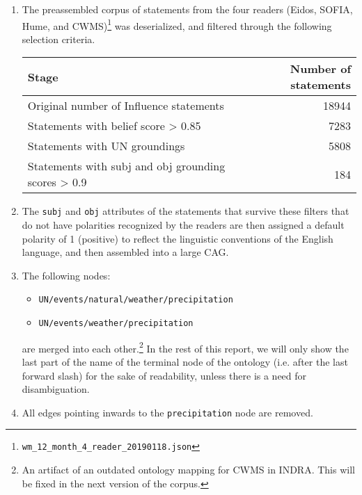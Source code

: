 \documentclass{apnotes}
\begin{document}
\begin{enumerate}

  \item The preassembled corpus of statements from the four readers (Eidos,
    SOFIA, Hume, and
    CWMS)\footnote{\texttt{wm\_12\_month\_4\_reader\_20190118.json}} was
    deserialized, and filtered through the following selection criteria.

\begin{center}
  \begin{tabular}{lr}
      \toprule
      Stage                                               & Number of statements\\
      \midrule
      Original number of Influence statements             & 18944\\
      Statements with belief score > 0.85                 & 7283\\
      Statements with UN groundings                       & 5808\\
      Statements with subj and obj grounding scores > 0.9 & 184\\
      \bottomrule
  \end{tabular}
\end{center}

\item The \texttt{subj} and \texttt{obj} attributes of the statements that
  survive these filters that do not have polarities recognized by the readers
  are then assigned a default polarity of 1 (positive) to reflect the linguistic
  conventions of the English language, and then assembled into a large CAG.

\item The following nodes:
  \begin{itemize}
    \item \texttt{UN/events/natural/weather/precipitation}
    \item \texttt{UN/events/weather/precipitation}
  \end{itemize}

  \noindent are merged into each other.\footnote{An artifact of an outdated ontology
  mapping for CWMS in INDRA.  This will be fixed in the next version of the
corpus.} In the rest of this report, we will only show the last part of the name
of the terminal node of the ontology (i.e. after the last forward slash) for the
sake of readability, unless there is a need for disambiguation.

\item All edges pointing inwards to the \texttt{precipitation} node are removed.


\end{enumerate}
\end{document}
